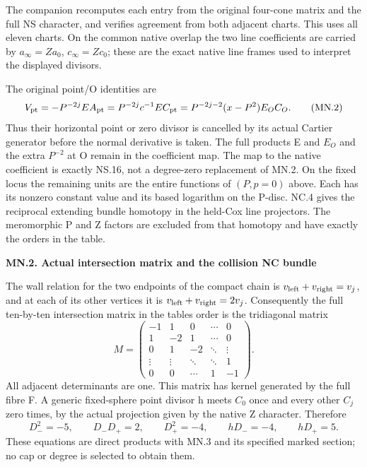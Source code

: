 The companion recomputes each entry from the original four-cone
matrix and the full NS character, and verifies agreement from both
adjacent charts. This uses all eleven charts. On the common native
overlap the two line coefficients are carried by
\(a_\infty=Za_0\), \(c_\infty=Zc_0\); these are the exact native
line frames used to interpret the displayed divisors.

The original point/O identities are
\[
 V_{\rm pt}=-P^{-2j}E A_{\rm pt}
 =P^{-2j}c^{-1}E C_{\rm pt}
 =P^{-2j-2}(x-P^2)E_OC_O.
 \tag{MN.2}
\]
Thus their horizontal point or zero divisor is cancelled by its
actual Cartier generator before the normal derivative is taken.
The full products E and \(E_O\) and the extra \(P^{-2}\) at O
remain in the coefficient map. The map to the native coefficient
is exactly NS.16, not a degree-zero replacement of MN.2. On the
fixed locus the remaining units are the entire functions of
\((P,p=0)\) above. Each has its nonzero constant value and its
based logarithm on the P-disc. NC.4 gives the reciprocal extending
bundle homotopy in the held-Cox line projectors. The meromorphic
P and Z factors are excluded from that homotopy and have exactly
the orders in the table.

\par

\medskip\noindent\textbf{MN.2. Actual intersection matrix and the collision NC bundle}

\par\nobreak

The wall relation for the two endpoints of the compact chain is
\(v_{\rm left}+v_{\rm right}=v_j\), and at each of its other
vertices it is \(v_{\rm left}+v_{\rm right}=2v_j\).
Consequently the full ten-by-ten intersection matrix in the table\textquotesingle s
order is the tridiagonal matrix
\[
 M=\begin{pmatrix}
 -1&1&0&\cdots&0\\
 1&-2&1&\cdots&0\\
 0&1&-2&\ddots&\vdots\\
 \vdots&\vdots&\ddots&\ddots&1\\
 0&0&\cdots&1&-1
 \end{pmatrix}.
 \tag{MN.3}
\]
All adjacent determinants are one. This matrix has kernel generated
by the full fibre F. A generic fixed-sphere point divisor h meets
\(C_0\) once and every other \(C_j\) zero times, by the actual
projection given by the native Z character. Therefore
\[
 D_-^2=-5,\qquad D_-D_+=2,\qquad D_+^2=-4,
 \qquad hD_-=-4,\qquad hD_+=5.
 \tag{MN.4}
\]
These equations are direct products with MN.3 and its specified
marked section; no cap or degree is selected to obtain them.

